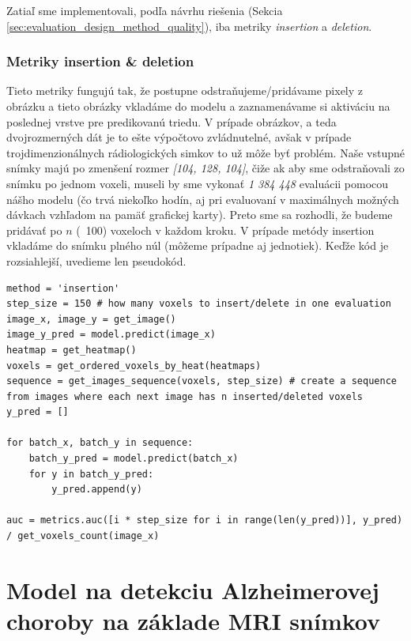 Zatiaľ sme implementovali, podľa návrhu riešenia (Sekcia \ref{sec:evaluation_design_method_quality}), iba metriky \textit{insertion} a \textit{deletion}.

\subsubsection{Metriky insertion \& deletion}

Tieto metriky fungujú tak, že postupne odstraňujeme/pridávame pixely z obrázku a tieto obrázky vkladáme do modelu a zaznamenávame si aktiváciu na poslednej vrstve pre predikovanú triedu. V prípade obrázkov, a teda dvojrozmerných dát je to ešte výpočtovo zvládnutelné, avšak v prípade trojdimenzionálnych rádiologických simkov to už môže byť problém. Naše vstupné snímky majú po zmenšení rozmer \textit{[104, 128, 104]}, čiže ak aby sme odstraňovali zo snímku po jednom voxeli, museli by sme vykonať \textit{1 384 448} evaluácii pomocou nášho modelu (čo trvá niekoľko hodín, aj pri evaluovaní v maximálnych možných dávkach vzhľadom na pamäť grafickej karty). Preto sme sa rozhodli, že budeme pridávať po $n$ (~100) voxeloch v každom kroku. V prípade metódy insertion vkladáme do snímku plného núl (môžeme prípadne aj jednotiek). Keďže kód je rozsiahlejší, uvedieme len pseudokód.

\begin{lstlisting}
method = 'insertion'
step_size = 150 # how many voxels to insert/delete in one evaluation
image_x, image_y = get_image()
image_y_pred = model.predict(image_x)
heatmap = get_heatmap()
voxels = get_ordered_voxels_by_heat(heatmaps)
sequence = get_images_sequence(voxels, step_size) # create a sequence from images where each next image has n inserted/deleted voxels
y_pred = []

for batch_x, batch_y in sequence:
    batch_y_pred = model.predict(batch_x)
    for y in batch_y_pred:
        y_pred.append(y)

auc = metrics.auc([i * step_size for i in range(len(y_pred))], y_pred) / get_voxels_count(image_x)
\end{lstlisting}

\section{Model na detekciu Alzheimerovej choroby na základe MRI snímkov}